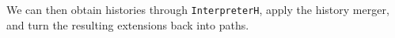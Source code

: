 \begin{code}%
\>[0][@{}l@{\AgdaIndent{1}}]%
\>[2]\AgdaSpace{}%
\AgdaSymbol{:}%
\>[804I]\AgdaSymbol{\{}\AgdaSpace{}%
\AgdaSpace{}%
\AgdaSymbol{:}\AgdaSpace{}%
\AgdaSymbol{\}}\AgdaSpace{}%
\<%
\\
\>[.][@{}l@{}]\<[804I]%
\>[11]\AgdaSymbol{(}\AgdaSpace{}%
\AgdaSymbol{:}\AgdaSpace{}%
\AgdaSpace{}%
\AgdaSpace{}%
\AgdaSymbol{)}\AgdaSpace{}%
\AgdaSymbol{(}\AgdaSpace{}%
\AgdaSymbol{:}\AgdaSpace{}%
\AgdaSpace{}%
\AgdaSpace{}%
\AgdaSymbol{)}\AgdaSpace{}%
\<%
\\
%
\>[11]\AgdaFunction{Σ[}\AgdaSpace{}%
\AgdaSpace{}%
\AgdaSpace{}%
\AgdaSpace{}%
\AgdaFunction{]}\AgdaSpace{}%
\AgdaSymbol{(}\AgdaFunction{Σ[}\AgdaSpace{}%
\AgdaSpace{}%
\AgdaSpace{}%
\AgdaSpace{}%
\AgdaSpace{}%
\AgdaSpace{}%
\AgdaFunction{]}\AgdaSpace{}%
\AgdaSymbol{(}\AgdaSpace{}%
\AgdaSpace{}%
\AgdaSpace{}%
\AgdaSpace{}%
\AgdaSpace{}%
\AgdaSpace{}%
\AgdaSymbol{))}\<%
\end{code}
\begin{code}[hide]%
%
\>[2]\AgdaSymbol{\}}\AgdaSpace{}%
\<%
\end{code}
We can then obtain histories through \texttt{InterpreterH}, apply the history merger,
and turn the resulting extensions back into paths.
